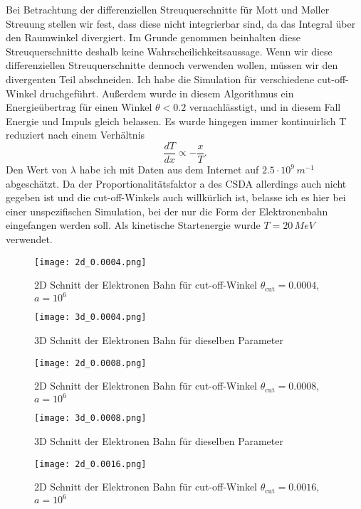 \documentclass[12pt]{article}
\begin{document}
Bei Betrachtung der differenziellen Streuquerschnitte für Mott und Møller Streuung stellen wir fest, dass diese nicht integrierbar sind, da das Integral über den Raumwinkel divergiert. Im Grunde genommen beinhalten diese Streuquerschnitte deshalb keine Wahrscheilichkeitsaussage. Wenn wir diese differenziellen Streuquerschnitte dennoch verwenden wollen, müssen wir den divergenten Teil abschneiden. Ich habe die Simulation für verschiedene cut-off-Winkel druchgeführt.
Außerdem wurde in diesem Algorithmus ein Energieübertrag für einen Winkel $\theta<0.2$ vernachlässtigt, und in diesem Fall Energie und Impuls gleich belassen. Es wurde hingegen immer kontinuirlich T reduziert nach einem Verhältnis
$$\frac{dT}{dx}\propto-\frac{x}{T}.$$
Den Wert von $\lambda$ habe ich mit Daten aus dem Internet auf $2.5\cdot10^9\,m^{-1}$ abgeschätzt. Da der Proportionalitätsfaktor a des CSDA allerdings auch nicht gegeben ist und die cut-off-Winkels auch willkürlich ist, belasse ich es hier bei einer unspezifischen Simulation, bei der nur die Form der Elektronenbahn eingefangen werden soll. Als kinetische Startenergie wurde $T=20\,MeV$ verwendet.

\begin{figure}[H]\centering\texttt{[image: 2d\_0.0004.png]}\caption{2D Schnitt der  Elektronen Bahn für cut-off-Winkel \newline$\theta_\text{cut}=0.0004$, $a=10^6$}\end{figure}

\begin{figure}[H]\centering\texttt{[image: 3d\_0.0004.png]}\caption{3D Schnitt der  Elektronen Bahn für dieselben Parameter}\end{figure}

\begin{figure}[H]\centering\texttt{[image: 2d\_0.0008.png]}\caption{2D Schnitt der  Elektronen Bahn für cut-off-Winkel \newline$\theta_\text{cut}=0.0008$, $a=10^6$}\end{figure}

\begin{figure}[H]\centering\texttt{[image: 3d\_0.0008.png]}\caption{3D Schnitt der  Elektronen Bahn für dieselben Parameter}\end{figure}

\begin{figure}[H]\centering\texttt{[image: 2d\_0.0016.png]}\caption{2D Schnitt der  Elektronen Bahn für cut-off-Winkel \newline$\theta_\text{cut}=0.0016$, $a=10^6$}\end{figure}
\end{document}
